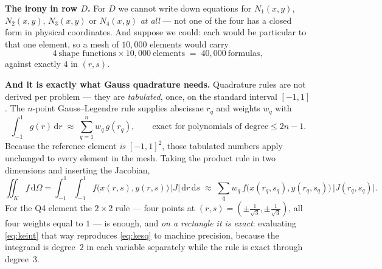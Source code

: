 \documentclass[11pt]{article}
\newcommand{\dOm}{\,\mathrm{d}\Omega}
\begin{document}
\medskip
\noindent
\textbf{The irony in row $D$.} For $D$ we cannot write down equations for
$N_{1}(x,y)$, $N_{2}(x,y)$, $N_{3}(x,y)$ or $N_{4}(x,y)$ \emph{at all} ---
not one of the four has a closed form in physical coordinates. And suppose we
could: each would be particular to that one element, so a mesh of $10{,}000$
elements would carry
\[
  4\ \text{shape functions}\times10{,}000\ \text{elements}
  \;=\;40{,}000\ \text{formulas},
\]
against exactly $4$ in $(r,s)$.

\medskip
\noindent
\textbf{And it is exactly what Gauss quadrature needs.} Quadrature rules are
not derived per problem --- they are \emph{tabulated}, once, on the standard
interval $[-1,1]$. The $n$-point Gauss--Legendre rule supplies abscissae
$r_{q}$ and weights $w_{q}$ with
\begin{equation}\label{eq:gauss1d}
  \int_{-1}^{1}g(r)\,\mathrm{d}r\;\approx\;\sum_{q=1}^{n}w_{q}\,g(r_{q}),
  \qquad\text{exact for polynomials of degree}\le 2n-1 .
\end{equation}
Because the reference element \emph{is} $[-1,1]^{2}$, those tabulated numbers
apply unchanged to every element in the mesh. Taking the product rule in two
dimensions and inserting the Jacobian,
\begin{equation}\label{eq:gauss2d}
  \iint_{K}f\dOm
  =\int_{-1}^{1}\!\!\int_{-1}^{1}f\bigl(x(r,s),y(r,s)\bigr)\,|J|\,
    \mathrm{d}r\,\mathrm{d}s
  \;\approx\;\sum_{q}w_{q}\,f\bigl(x(r_{q},s_{q}),y(r_{q},s_{q})\bigr)\,
    \bigl|J(r_{q},s_{q})\bigr| .
\end{equation}
For the Q4 element the $2\times2$ rule --- four points at
$(r,s)=(\pm\tfrac{1}{\sqrt3},\pm\tfrac{1}{\sqrt3})$, all four weights equal to
$1$ --- is enough, and \emph{on a rectangle it is exact}: evaluating
\eqref{eq:keint} that way reproduces \eqref{eq:kesq} to machine precision,
because the integrand is degree~$2$ in each variable separately while the rule
is exact through degree~$3$.
\end{document}
